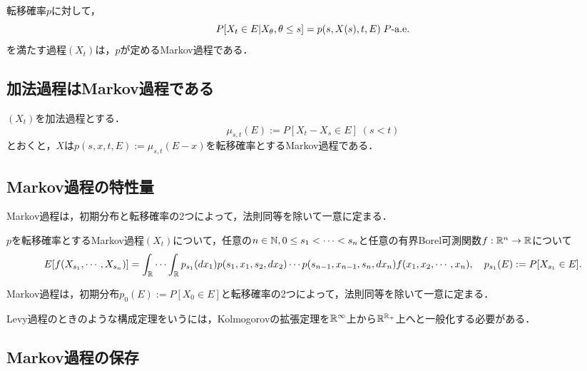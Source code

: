 \documentclass[uplatex,dvipdfmx]{jsreport}
\begin{document}
\begin{lemma}
    転移確率$p$に対して，
    \[P[X_t\in E|X_\theta,\theta\le s]=p(s,X(s),t,E)\;P\text{-a.e.}\]
    を満たす過程$(X_t)$は，$p$が定めるMarkov過程である．
\end{lemma}

\subsection{加法過程はMarkov過程である}

\begin{theorem}
    $(X_t)$を加法過程とする．
    \[\mu_{s,t}(E):=P[X_t-X_s\in E]\;(s<t)\]
    とおくと，$X$は$p(s,x,t,E):=\mu_{s,t}(E-x)$を転移確率とするMarkov過程である．
\end{theorem}

\subsection{Markov過程の特性量}

\begin{tcolorbox}[colframe=ForestGreen, colback=ForestGreen!10!white,breakable,colbacktitle=ForestGreen!40!white,coltitle=black,fonttitle=\bfseries\sffamily,
title=]
    Markov過程は，初期分布と転移確率の2つによって，法則同等を除いて一意に定まる．
\end{tcolorbox}

\begin{lemma}
    $p$を転移確率とするMarkov過程$(X_t)$について，任意の$n\in\mathbb{N},0\le s_1<\cdots<s_n$と任意の有界Borel可測関数$f:\mathbb{R}^n\to\mathbb{R}$について
    \[E[f(X_{s_1},\cdots,X_{s_n})]=\int_{\mathbb{R}}\cdots\int_{\mathbb{R}} p_{s_1}(dx_1)p(s_1,x_1,s_2,dx_2)\cdots p(s_{n-1},x_{n-1},s_n,dx_n)f(x_1,x_2,\cdots,x_n),\quad  p_{s_1}(E):=P[X_{s_1}\in E].\]
\end{lemma}

\begin{corollary}
    Markov過程は，初期分布$p_0(E):=P[X_0\in E]$と転移確率の2つによって，法則同等を除いて一意に定まる．
\end{corollary}
\begin{remark}
    Levy過程のときのような構成定理をいうには，Kolmogorovの拡張定理を$\mathbb{R}^\infty$上から$\mathbb{R}^{\mathbb{R}_+}$上へと一般化する必要がある．
\end{remark}

\subsection{Markov過程の保存}
\end{document}
